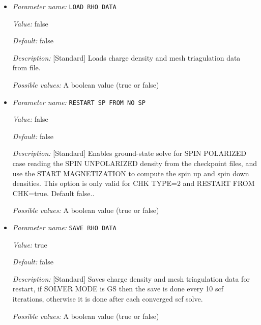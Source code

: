 \begin{itemize}
\item {\it Parameter name:} {\tt LOAD RHO DATA}
\label{parameters:SCF Checkpointing and Restart/LOAD RHO DATA}
\label{parameters:SCF_20Checkpointing_20and_20Restart/LOAD_20RHO_20DATA}


{\it Value:} false


{\it Default:} false


{\it Description:} [Standard] Loads charge density and mesh triagulation data from file.


{\it Possible values:} A boolean value (true or false)
\item {\it Parameter name:} {\tt RESTART SP FROM NO SP}
\label{parameters:SCF Checkpointing and Restart/RESTART SP FROM NO SP}
\label{parameters:SCF_20Checkpointing_20and_20Restart/RESTART_20SP_20FROM_20NO_20SP}


{\it Value:} false


{\it Default:} false


{\it Description:} [Standard] Enables ground-state solve for SPIN POLARIZED case reading the SPIN UNPOLARIZED density from the checkpoint files, and use the START MAGNETIZATION to compute the spin up and spin down densities. This option is only valid for CHK TYPE=2 and RESTART FROM CHK=true. Default false..


{\it Possible values:} A boolean value (true or false)
\item {\it Parameter name:} {\tt SAVE RHO DATA}
\label{parameters:SCF Checkpointing and Restart/SAVE RHO DATA}
\label{parameters:SCF_20Checkpointing_20and_20Restart/SAVE_20RHO_20DATA}


{\it Value:} true


{\it Default:} false


{\it Description:} [Standard] Saves charge density and mesh triagulation data for restart, if SOLVER MODE is GS then the save is done every 10 scf iterations, otherwise it is done after each converged scf solve.


{\it Possible values:} A boolean value (true or false)
\end{itemize}

